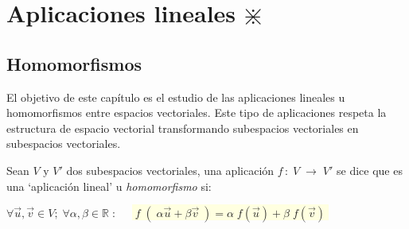 
\chapter{Aplicaciones lineales $\divideontimes$}	


\section{Homomorfismos}	


El objetivo de este capítulo es el estudio de las aplicaciones lineales u homomorfismos entre espacios vectoriales. Este tipo de aplicaciones respeta la estructura de espacio vectorial transformando subespacios vectoriales en subespacios vectoriales. 


\begin{defi}
Sean $V \text{ y } V'$	dos subespacios vectoriales, una aplicación $f\,: \; V \; \to \; V'$ se dice que es una `aplicación lineal' u \emph{homomorfismo} si:

$\forall \vec u, \vec v \in V ; \; \forall \alpha, \beta \in \mathbb R \; : \quad $ \colorbox{LightYellow}{$\boxed{\; f\;(\;\alpha \vec u + \beta \vec v \; )= \alpha\; f(\vec u) + \beta \; f (\vec v)\; }$}
\end{defi}

